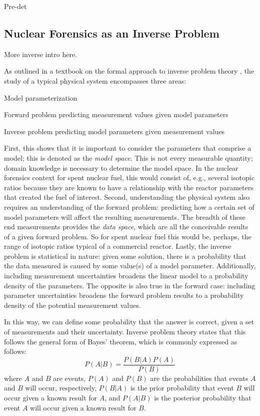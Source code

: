 Pre-det

\subsection{Nuclear Forensics as an Inverse Problem}
\label{sec:inverse}

More inverse intro here.

As outlined in a textbook on the formal approach to inverse problem theory
\cite{inverse_theory}, the study of a typical physical system encompasses three
areas:
\begin{hanglist}[itemsep=0pt, parsep=0pt, partopsep=0pt, topsep=0pt, leftmargin=15pt]
    \item Model parameterization 
    \item Forward problem predicting measurement values given model parameters 
    \item Inverse problem predicting model parameters given measurement values 
\end{hanglist}
First, this shows that it is important to consider the parameters that comprise
a model; this is denoted as the \textit{model space}. This is not every
measurable quantity; domain knowledge is necessary to determine the model
space. In the nuclear forensics context for spent nuclear fuel, this would
consist of, e.g., several isotopic ratios because they are known to have a
relationship with the reactor parameters that created the fuel of interest.
Second, understanding the physical system also requires an understanding of the
forward problem: predicting how a certain set of model parameters will affect
the resulting measurements. The breadth of these end measurements provides the
\textit{data space}, which are all the conceivable results of a given forward
problem. So for spent nuclear fuel this would be, perhaps, the range of
isotopic ratios typical of a commercial reactor. Lastly, the inverse problem is
statistical in nature: given some solution, there is a probability that the
data measured is caused by some value(s) of a model parameter. Additionally,
including measurement uncertainties broadens the linear model to a probability
density of the parameters. The opposite is also true in the forward case:
including parameter uncertainties broadens the forward problem results to a
probability density of the potential measurement values.

In this way, we can define some probability that the answer is correct, given a
set of measurements and their uncertainty. Inverse problem theory states that
this follows the general form of Bayes' theorem, which is commonly expressed as
follows:
\begin{equation}
P(A|B) = \frac{P(B|A)P(A)}{P(B)}
\end{equation}
where $A$ and $B$ are events, $P(A)$ and $P(B)$ are the probabilities that events
$A$ and $B$ will occur, respectively, $P(B|A)$ is the prior probability that event 
$B$ will occur given a known result for $A$, and $P(A|B)$ is the posterior 
probability that event $A$ will occur given a known result for $B$.

